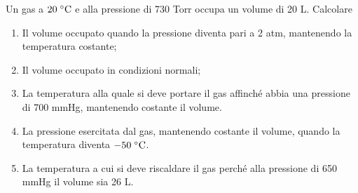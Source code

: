 \newpage

\begin{esercizio}[$\bigstar$]
    Un gas a $20 \; ^{\circ} \rm C$ e alla pressione di 730 Torr occupa un volume di 20 L. Calcolare
    \begin{enumerate}
        \item Il volume occupato quando la pressione diventa pari a 2 atm, mantenendo la temperatura costante;
        \item Il volume occupato in condizioni normali;
        \item La temperatura alla quale si deve portare il gas affinché abbia una pressione di 700 mmHg, mantenendo costante il volume.
        \item La pressione esercitata dal gas, mantenendo costante il volume, quando la temperatura diventa $-50 \; ^{\circ} \rm C$.
        \item La temperatura a cui si deve riscaldare il gas perché alla pressione di 650 mmHg il volume sia 26 L.
    \end{enumerate}
\end{esercizio}
